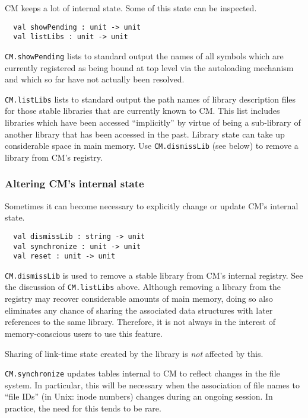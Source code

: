 \documentclass{article}
\begin{document}
CM keeps a lot of internal state.  Some of this state can be inspected.

\begin{verbatim}
  val showPending : unit -> unit
  val listLibs : unit -> unit
\end{verbatim}

{\tt CM.showPending} lists to standard output the names of all symbols
which are currently registered as being bound at top level via the
autoloading mechanism and which so far have not actually been
resolved.

{\tt CM.listLibs} lists to standard output the path names of library
description files for those stable libraries that are currently known
to CM.  This list includes libraries which have been accessed
``implicitly'' by virtue of being a sub-library of another library
that has been accessed in the past.  Library state can take up
considerable space in main memory.  Use {\tt CM.dismissLib} (see
below) to remove a library from CM's registry.

\subsubsection*{Altering CM's internal state}

Sometimes it can become necessary to explicitly change or update CM's
internal state.

\begin{verbatim}
  val dismissLib : string -> unit
  val synchronize : unit -> unit
  val reset : unit -> unit
\end{verbatim}

{\tt CM.dismissLib} is used to remove a stable library from CM's
internal registry.  See the discussion of {\tt CM.listLibs} above.
Although removing a library from the registry may recover considerable
amounts of main memory, doing so also eliminates any chance of sharing
the associated data structures with later references to the same
library.  Therefore, it is not always in the interest of
memory-conscious users to use this feature.

Sharing of link-time state created by the library is {\em not}
affected by this.

{\tt CM.synchronize} updates tables internal to CM to reflect changes
in the file system.  In particular, this will be necessary when the
association of file names to ``file IDs'' (in Unix: inode numbers)
changes during an ongoing session.  In practice, the need for this
tends to be rare.
\end{document}
